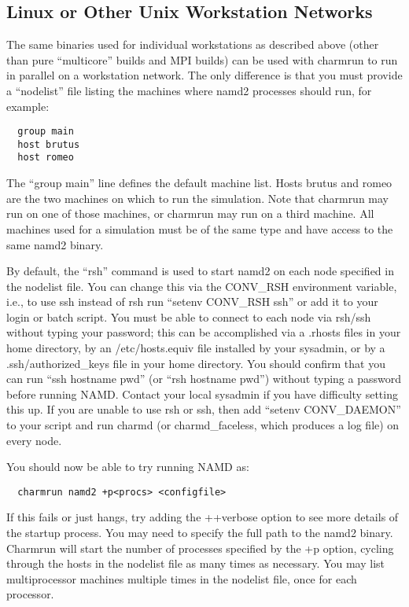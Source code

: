 \subsection{Linux or Other Unix Workstation Networks}

The same binaries used for individual workstations as described above
(other than pure ``multicore'' builds and MPI builds)
can be used with charmrun to run in parallel on a workstation network.
The only difference is that you must provide a ``nodelist'' file listing
the machines where namd2 processes should run, for example:

\begin{verbatim}
  group main
  host brutus
  host romeo
\end{verbatim}

The ``group main'' line defines the default machine list.  Hosts brutus
and romeo are the two machines on which to run the simulation.  Note
that charmrun may run on one of those machines, or charmrun may run
on a third machine.  All machines used for a simulation must be of the
same type and have access to the same namd2 binary.

By default, the ``rsh'' command is used to start namd2
on each node specified in the nodelist file.  You can change this via
the CONV\_RSH environment variable, i.e., to use ssh instead of rsh run
``setenv CONV\_RSH ssh'' or add it to your login or batch script.  You
must be able to connect to each node via rsh/ssh without typing your
password; this can be accomplished via a .rhosts files in your home
directory, by an /etc/hosts.equiv file installed by your sysadmin, or
by a .ssh/authorized\_keys file in your home directory.  You should
confirm that you can run ``ssh hostname pwd'' (or ``rsh hostname pwd'')
without typing a password before running NAMD.  Contact your local
sysadmin if you have difficulty setting this up.  If you are unable to
use rsh or ssh, then add ``setenv CONV\_DAEMON'' to your script and run 
charmd (or charmd\_faceless, which produces a log file) on every node.

You should now be able to try running NAMD as:

\begin{verbatim}
  charmrun namd2 +p<procs> <configfile>
\end{verbatim}

If this fails or just hangs, try adding the ++verbose option to see
more details of the startup process.  You may need to specify the full
path to the namd2 binary.  Charmrun will start the number of processes
specified by the +p option, cycling through the hosts in the nodelist
file as many times as necessary.  You may list multiprocessor machines
multiple times in the nodelist file, once for each processor.

